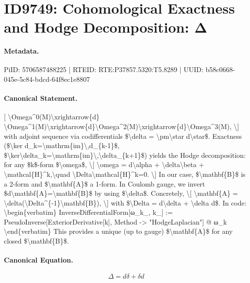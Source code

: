 \section*{ID9749: Cohomological Exactness and Hodge Decomposition: Δ}
\paragraph{Metadata.}
PiID: 5706587488225 | RTEID: RTE:P37857.5320:T5.8289 | UUID: b58c0668-045e-5c84-bdcd-64f8ec1e8807

\paragraph{Canonical Statement.}
[ \textbackslash{}Omega\textasciicircum{}0(M)\textbackslash{}xrightarrow\{d\} \textbackslash{}Omega\textasciicircum{}1(M)\textbackslash{}xrightarrow\{d\}\textbackslash{}Omega\textasciicircum{}2(M)\textbackslash{}xrightarrow\{d\}\textbackslash{}Omega\textasciicircum{}3(M), \textbackslash{}] with adjoint sequence via codifferentials \$\textbackslash{}delta = \textbackslash{}pm\textbackslash{}star d\textbackslash{}star\$. Exactness (\$\textbackslash{}ker d\_k=\textbackslash{}mathrm\{im\}\textbackslash{},d\_\{k-1\}\$, \$\textbackslash{}ker\textbackslash{}delta\_k=\textbackslash{}mathrm\{im\}\textbackslash{},\textbackslash{}delta\_\{k+1\}\$) yields the Hodge decomposition: for any \$k\$-form \$\textbackslash{}omega\$, \textbackslash{}[ \textbackslash{}omega = d\textbackslash{}alpha + \textbackslash{}delta\textbackslash{}beta + \textbackslash{}mathcal\{H\}\textasciicircum{}k,\textbackslash{}quad \textbackslash{}Delta\textbackslash{}mathcal\{H\}\textasciicircum{}k=0. \textbackslash{}] In our case, \$\textbackslash{}mathbf\{B\}\$ is a 2-form and \$\textbackslash{}mathbf\{A\}\$ a 1-form. In Coulomb gauge, we invert \$d\textbackslash{}mathbf\{A\}=\textbackslash{}mathbf\{B\}\$ by using \$\textbackslash{}delta\$. Concretely, \textbackslash{}[ \textbackslash{}mathbf\{A\} = \textbackslash{}delta(\textbackslash{}Delta\textasciicircum{}\{-1\}\textbackslash{}mathbf\{B\}), \textbackslash{}] with \$\textbackslash{}Delta = d\textbackslash{}delta + \textbackslash{}delta d\$. In code: \textbackslash{}begin\{verbatim\} InverseDifferentialForm[ω\_k\_, k\_] := PseudoInverse[ExteriorDerivative[k], Method -> "HodgeLaplacian"] @ ω\_k \textbackslash{}end\{verbatim\} This provides a unique (up to gauge) \$\textbackslash{}mathbf\{A\}\$ for any closed \$\textbackslash{}mathbf\{B\}\$.

\paragraph{Canonical Equation.}
\[
\Delta = d\delta + \delta d
\]

